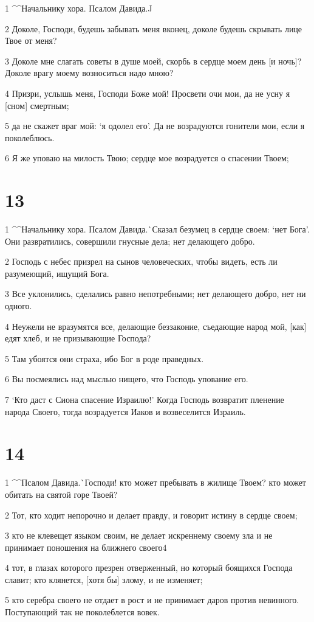 \par 1 ^^Начальнику хора. Псалом Давида.^^
\par 2 Доколе, Господи, будешь забывать меня вконец, доколе будешь скрывать лице Твое от меня?
\par 3 Доколе мне слагать советы в душе моей, скорбь в сердце моем день [и ночь]? Доколе врагу моему возноситься надо мною?
\par 4 Призри, услышь меня, Господи Боже мой! Просвети очи мои, да не усну я [сном] смертным;
\par 5 да не скажет враг мой: `я одолел его'. Да не возрадуются гонители мои, если я поколеблюсь.
\par 6 Я же уповаю на милость Твою; сердце мое возрадуется о спасении Твоем;

\chapter{13}

\par 1 ^^Начальнику хора. Псалом Давида.^^ Сказал безумец в сердце своем: `нет Бога'. Они развратились, совершили гнусные дела; нет делающего добро.
\par 2 Господь с небес призрел на сынов человеческих, чтобы видеть, есть ли разумеющий, ищущий Бога.
\par 3 Все уклонились, сделались равно непотребными; нет делающего добро, нет ни одного.
\par 4 Неужели не вразумятся все, делающие беззаконие, съедающие народ мой, [как] едят хлеб, и не призывающие Господа?
\par 5 Там убоятся они страха, ибо Бог в роде праведных.
\par 6 Вы посмеялись над мыслью нищего, что Господь упование его.
\par 7 `Кто даст с Сиона спасение Израилю!' Когда Господь возвратит пленение народа Своего, тогда возрадуется Иаков и возвеселится Израиль.

\chapter{14}

\par 1 ^^Псалом Давида.^^ Господи! кто может пребывать в жилище Твоем? кто может обитать на святой горе Твоей?
\par 2 Тот, кто ходит непорочно и делает правду, и говорит истину в сердце своем;
\par 3 кто не клевещет языком своим, не делает искреннему своему зла и не принимает поношения на ближнего своего4
\par 4 тот, в глазах которого презрен отверженный, но который боящихся Господа славит; кто клянется, [хотя бы] злому, и не изменяет;
\par 5 кто серебра своего не отдает в рост и не принимает даров против невинного. Поступающий так не поколеблется вовек.

